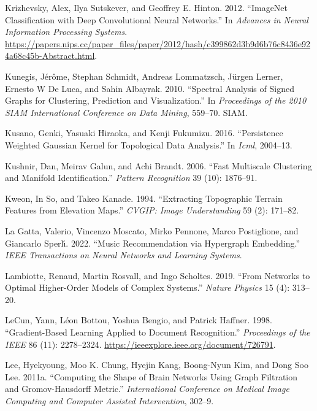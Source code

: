 \documentclass[
  12pt,
]{krantz}
\newlength{\cslhangindent}
\newenvironment{CSLReferences}[2] %
 {\begin{list}{}{%
  \setlength{\itemindent}{0pt}
  \setlength{\leftmargin}{0pt}
  \setlength{\parsep}{0pt}
  \ifodd #1
   \setlength{\leftmargin}{\cslhangindent}
   \setlength{\itemindent}{-1\cslhangindent}
  \fi
  \setlength{\itemsep}{#2\baselineskip}}}
 {\end{list}}
\begin{document}
\begin{CSLReferences}{1}{0}
Krizhevsky, Alex, Ilya Sutskever, and Geoffrey E. Hinton. 2012.
{``Image{N}et Classification with Deep Convolutional Neural Networks.''}
In \emph{Advances in Neural Information Processing Systems}.
\url{https://papers.nips.cc/paper_files/paper/2012/hash/c399862d3b9d6b76c8436e924a68c45b-Abstract.html}.

Kunegis, Jérôme, Stephan Schmidt, Andreas Lommatzsch, Jürgen Lerner,
Ernesto W De Luca, and Sahin Albayrak. 2010. {``Spectral Analysis of
Signed Graphs for Clustering, Prediction and Visualization.''} In
\emph{Proceedings of the 2010 SIAM International Conference on Data
Mining}, 559--70. SIAM.

Kusano, Genki, Yasuaki Hiraoka, and Kenji Fukumizu. 2016. {``Persistence
Weighted {G}aussian Kernel for Topological Data Analysis.''} In
\emph{Icml}, 2004--13.

Kushnir, Dan, Meirav Galun, and Achi Brandt. 2006. {``Fast Multiscale
Clustering and Manifold Identification.''} \emph{Pattern Recognition} 39
(10): 1876--91.

Kweon, In So, and Takeo Kanade. 1994. {``Extracting Topographic Terrain
Features from Elevation Maps.''} \emph{CVGIP: Image Understanding} 59
(2): 171--82.

La Gatta, Valerio, Vincenzo Moscato, Mirko Pennone, Marco Postiglione,
and Giancarlo Sperlı́. 2022. {``Music Recommendation via Hypergraph
Embedding.''} \emph{IEEE Transactions on Neural Networks and Learning
Systems}.

Lambiotte, Renaud, Martin Rosvall, and Ingo Scholtes. 2019. {``From
Networks to Optimal Higher-Order Models of Complex Systems.''}
\emph{Nature Physics} 15 (4): 313--20.

LeCun, Yann, Léon Bottou, Yoshua Bengio, and Patrick Haffner. 1998.
{``Gradient-Based Learning Applied to Document Recognition.''}
\emph{Proceedings of the IEEE} 86 (11): 2278--2324.
\url{https://ieeexplore.ieee.org/document/726791}.

Lee, Hyekyoung, Moo K. Chung, Hyejin Kang, Boong-Nyun Kim, and Dong Soo
Lee. 2011a. {``Computing the Shape of Brain Networks Using Graph
Filtration and Gromov-Hausdorff Metric.''} \emph{International
Conference on Medical Image Computing and Computer Assisted
Intervention}, 302--9.


\end{CSLReferences}
\end{document}
